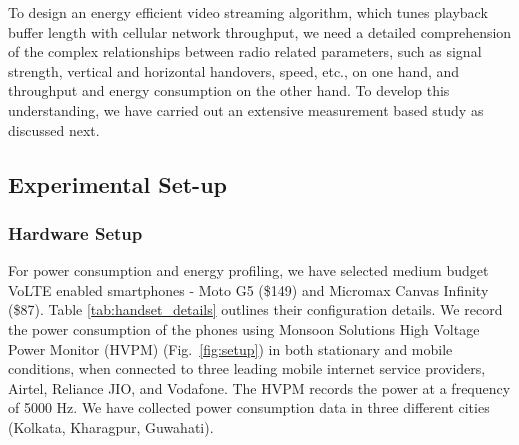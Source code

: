 To design an energy efficient video streaming algorithm, which tunes playback buffer length with cellular network throughput, we need a detailed comprehension of the complex relationships between radio related parameters, such as signal strength, vertical and horizontal handovers, speed, etc., on one hand, and throughput and energy consumption on the other hand. To develop this understanding, we have carried out an extensive measurement based study as discussed next.
\subsection{Experimental Set-up}
\subsubsection{Hardware Setup}
For power consumption and energy profiling, we have selected medium budget VoLTE enabled smartphones -  Moto G5  (\$149) and Micromax Canvas Infinity (\$87). Table \ref{tab:handset_details} outlines their configuration details. We record the power consumption of the phones using Monsoon Solutions High Voltage Power Monitor (HVPM) \cite{HVPM, Yang2018,Geng2015} (Fig.~\ref{fig:setup}) in both stationary and mobile conditions, when connected to three leading mobile internet service providers, Airtel, Reliance JIO, and Vodafone. The \ac{HVPM} records the power at a frequency of 5000 Hz. We have collected power consumption data in three different cities (Kolkata, Kharagpur, Guwahati).

